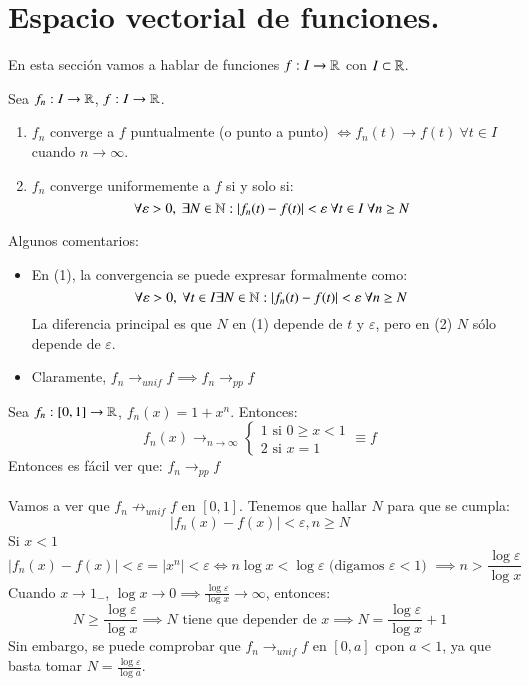 \section{Espacio vectorial de funciones.}
En esta sección vamos a hablar de funciones $f: I \to \mathbb{R}$ con $I \subset \mathbb{R}$.
\begin{dfn}
    Sea $f_n : I \to \mathbb{R}$, $f: I \to \mathbb{R}$.\\
    \begin{enumerate}
        \item $f_n$ converge a $f$ puntualmente (o punto a punto) $\iff f_n(t) \to f(t)\ \forall t \in I$ cuando $n\to \infty$.
        \item $f_n$ converge uniformemente a $f$ si y solo si:
        $$
            \forall \varepsilon > 0,\ \exists N \in \N : |f_n(t) - f(t)| < \varepsilon\ \forall t \in I\ \forall n \geq N
        $$
    \end{enumerate}
\end{dfn}
\begin{obs}
    Algunos comentarios:\\
    \begin{itemize}
        \item En (1), la convergencia se puede expresar formalmente como:
    $$
        \forall \varepsilon > 0,\ \forall t \in I \exists N \in \mathbb{N} : |f_n(t) - f(t)| < \varepsilon\ \forall n \geq N
    $$
    La diferencia principal es que $N$ en (1) depende de $t$ y $ \varepsilon$, pero en (2) $N$ sólo depende de $\varepsilon$.
        \item Claramente, $f_n \to_{unif} f \implies f_n \to_{pp} f$
\end{itemize}
\end{obs}
\begin{eg}
    Sea $f_n: [0, 1] \to \mathbb{R}$, $f_n(x) = 1+x^n$. Entonces:
    $$
        f_n(x) \to_{n \to \infty}
        \begin{cases}
            1 \text{ si } 0\geq x < 1 \\
            2 \text{ si } x = 1
        \end{cases} \equiv f
    $$
    Entonces es fácil ver que: $f_n \to_{pp} f$\\\\
    Vamos a ver que $f_n \not\to_{unif} f$ en $[0, 1]$. Tenemos que hallar $N$ para que se cumpla:
    $$
        |f_n(x) - f(x)| < \varepsilon, n\geq N
    $$
    Si $x < 1$
    $$
        |f_n(x) - f(x)| < \varepsilon = |x^n| < \varepsilon \iff n \log x < \log \varepsilon \text{ (digamos $\varepsilon < 1$) } \implies n > \frac{\log \varepsilon}{\log x}
    $$
    Cuando $x \to 1_-$, $\log x \to 0 \implies \frac{\log \varepsilon}{\log x} \to \infty$, entonces:
    $$
        N \geq \frac{\log \varepsilon}{\log x} \implies N \text{ tiene que depender de }x \implies N = \frac{\log \varepsilon}{\log x} + 1
    $$
    Sin embargo, se puede comprobar que $f_n \to_{unif} f$ en $[0, a]$ cpon $a < 1$, ya que basta tomar $N = \frac{\log \varepsilon}{\log a}$.
\end{eg}
